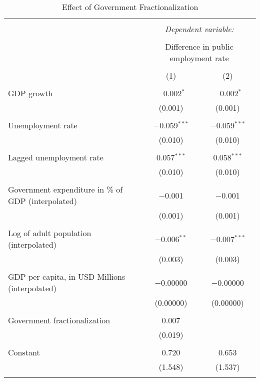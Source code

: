 
\begin{table}[!htbp] \centering 
  \caption{Effect of Government Fractionalization} 
  \label{} 
\begin{tabular}{@{\extracolsep{5pt}}lcc} 
\\[-1.8ex]\hline 
\hline \\[-1.8ex] 
 & \multicolumn{2}{c}{\textit{Dependent variable:}} \\ 
\cline{2-3} 
\\[-1.8ex] & \multicolumn{2}{c}{Difference in public employment rate} \\ 
\\[-1.8ex] & (1) & (2)\\ 
\hline \\[-1.8ex] 
 GDP growth & $-$0.002$^{*}$ & $-$0.002$^{*}$ \\ 
  & (0.001) & (0.001) \\ 
  & & \\ 
 Unemployment rate & $-$0.059$^{***}$ & $-$0.059$^{***}$ \\ 
  & (0.010) & (0.010) \\ 
  & & \\ 
 Lagged unemployment rate & 0.057$^{***}$ & 0.058$^{***}$ \\ 
  & (0.010) & (0.010) \\ 
  & & \\ 
 Government expenditure in \% of GDP (interpolated) & $-$0.001 & $-$0.001 \\ 
  & (0.001) & (0.001) \\ 
  & & \\ 
 Log of adult population (interpolated) & $-$0.006$^{**}$ & $-$0.007$^{***}$ \\ 
  & (0.003) & (0.003) \\ 
  & & \\ 
 GDP per capita, in USD Millions (interpolated) & $-$0.00000 & $-$0.00000 \\ 
  & (0.00000) & (0.00000) \\ 
  & & \\ 
 Government fractionalization & 0.007 &  \\ 
  & (0.019) &  \\ 
  & & \\ 
 Constant & 0.720 & 0.653 \\ 
  & (1.548) & (1.537) \\ 
  & & \\ 

\end{tabular}
\end{table}
